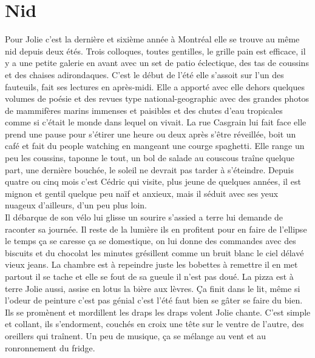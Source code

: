\clearpage
\section*{Nid}

Pour Jolie c’est la dernière et sixième année à Montréal elle se
trouve au même nid depuis deux étés. Trois colloques, toutes
gentilles, le grille pain est efficace, il y a une petite galerie en
avant avec un set de patio éclectique, des tas de coussins et des
chaises adirondaques. C’est le début de l’été elle s’assoit sur l’un
des fauteuils, fait ses lectures en après-midi. Elle a apporté avec
elle dehors quelques volumes de poésie et des revues type
national-geographic avec des grandes photos de mammifères marins
immenses et paisibles et des chutes d’eau tropicales comme si c’était
le monde dans lequel on vivait.  La rue Casgrain lui fait face elle
prend une pause pour s’étirer une heure ou deux après s’être
réveillée, boit un café et fait du people watching en mangeant une
courge spaghetti. Elle range un peu les coussins, taponne le tout, un
bol de salade au couscous traîne quelque part, une dernière bouchée,
le soleil ne devrait pas tarder à s’éteindre. Depuis quatre ou cinq
mois c’est Cédric qui visite, plus jeune de quelques années, il est
mignon et gentil quelque peu naïf et anxieux, mais il séduit avec ses
yeux nuageux d’ailleurs, d’un peu plus loin.\\
\clearpage
Il débarque de son vélo lui glisse un sourire s’assied a terre lui
demande de raconter sa journée. Il reste de la lumière ils en
profitent pour en faire de l’ellipse le temps ça se caresse ça se
domestique, on lui donne des commandes avec des biscuits et du
chocolat les minutes grésillent comme un bruit blanc le ciel délavé
vieux jeans. La chambre est à repeindre juste les bobettes à remettre
il en met partout il se tache et elle se fout de sa gueule il n’est
pas doué. La pizza est à terre Jolie aussi, assise en lotus la bière
aux lèvres.  Ça finit dans le lit, même si l’odeur de peinture c’est
pas génial c’est l’été faut bien se gâter se faire du bien. Ils se
promènent et mordillent les draps les draps volent Jolie chante. C’est
simple et collant, ils s’endorment, couchés en croix une tête sur le
ventre de l’autre, des oreillers qui traînent. Un peu de musique, ça
se mélange au vent et au ronronnement du fridge.\\

